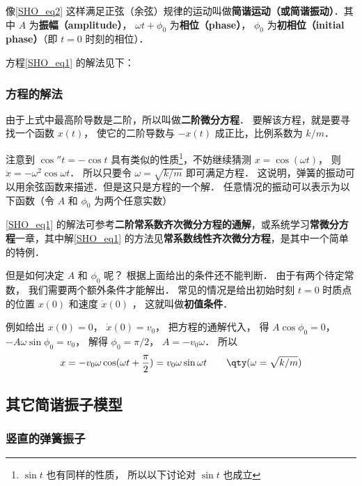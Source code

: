 像\autoref{SHO_eq2} 这样满足正弦（余弦）规律的运动叫做\textbf{简谐运动（或简谐振动）}．其中 $A$ 为\textbf{振幅（amplitude）}， $\omega t + \phi_0$ 为\textbf{相位（phase）}， $\phi_0$ 为\textbf{初相位（initial phase）}（即 $t = 0$ 时刻的相位）． 


方程\autoref{SHO_eq1} 的解法见下：



\subsubsection{方程的解法}

由于上式中最高阶导数是二阶，所以叫做\textbf{二阶微分方程}． 要解该方程，就是要寻找一个函数 $x(t)$， 使它的二阶导数与 $- x(t)$ 成正比，比例系数为 $k/m$． 

注意到 $\cos'' t =  - \cos t$ 具有类似的性质\footnote{$\sin t$ 也有同样的性质， 所以以下讨论对 $\sin t$ 也成立}，不妨继续猜测 $x = \cos(\omega t)$， 则 $\ddot x =  - {\omega ^2}\cos \omega t$． 所以只要令 $\omega = \sqrt{k/m}$ 即可满足方程． 这说明，弹簧的振动可以用余弦函数来描述．但是这只是方程的一个解． 任意情况的振动可以表示为以下函数（令 $A$ 和 $\phi_0$ 为两个任意实数）

\autoref{SHO_eq1} 的解法可参考\textbf{二阶常系数齐次微分方程的通解}，或系统学习\textbf{常微分方程}一章，其中解\autoref{SHO_eq1} 的方法见\textbf{常系数线性齐次微分方程}，是其中一个简单的特例．



但是如何决定 $A$ 和 $\phi_0$ 呢？ 根据上面给出的条件还不能判断． 由于有两个待定常数， 我们需要两个额外条件才能解出． 常见的情况是给出初始时刻 $t = 0$ 时质点的位置 $x(0)$ 和速度 $\dot x(0)$ ， 这就叫做\textbf{初值条件}．

例如给出 $x(0) = 0$，  $\dot x(0) = v_0$， 把方程的通解代入， 得 $A\cos \phi_0 = 0$，  $ - A\omega \sin \phi_0 = v_0$， 解得 $\phi_0 = \pi /2$，  $A =  -v_0\omega $． 所以
\begin{equation}
x =  - v_0\omega \cos (\omega t + \frac{\pi }{2}) = v_0\omega \sin \omega t \qquad \qty(\omega  = \sqrt{k/m})
\end{equation}


\subsection{其它简谐振子模型}

\subsubsection{竖直的弹簧振子}

